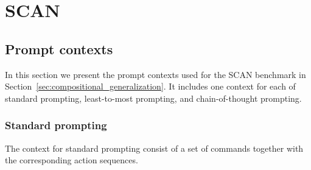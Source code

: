 \section{SCAN}
\label{app:scan}
\subsection{Prompt contexts}
\label{app:scan-prompts}
In this section we present the prompt contexts used for the SCAN benchmark in Section~\ref{sec:compositional_generalization}. It includes one context for each of standard prompting, least-to-most prompting, and chain-of-thought prompting.

\subsubsection{Standard prompting}
The context for standard prompting consist of a set of commands together with the corresponding action sequences.

